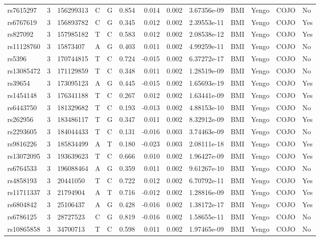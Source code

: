 \documentclass[11pt,twoside]{bristolthesis}
\begin{document}
\begin{longtable}[t]{lrlllrrrlllll}
rs7615297 & 3 & 156299313 & C & G & 0.854 & 0.014 & 0.002 & 3.67356e-09 & BMI & Yengo & COJO & No\\
rs6767619 & 3 & 156893782 & C & G & 0.345 & 0.012 & 0.002 & 2.39553e-11 & BMI & Yengo & COJO & Yes\\
\addlinespace
rs827092 & 3 & 157985182 & T & C & 0.583 & 0.012 & 0.002 & 2.08538e-12 & BMI & Yengo & COJO & Yes\\
rs11128760 & 3 & 15873407 & A & G & 0.403 & 0.011 & 0.002 & 4.99259e-11 & BMI & Yengo & COJO & No\\
rs5396 & 3 & 170744815 & T & C & 0.724 & -0.015 & 0.002 & 6.37272e-17 & BMI & Yengo & COJO & No\\
rs13085472 & 3 & 171129859 & T & C & 0.348 & 0.011 & 0.002 & 1.28519e-09 & BMI & Yengo & COJO & No\\
rs39654 & 3 & 173095123 & A & G & 0.445 & -0.015 & 0.002 & 1.65693e-19 & BMI & Yengo & COJO & Yes\\
\addlinespace
rs1454148 & 3 & 176341188 & T & C & 0.267 & 0.012 & 0.002 & 1.63441e-09 & BMI & Yengo & COJO & Yes\\
rs6443750 & 3 & 181329682 & T & C & 0.193 & -0.013 & 0.002 & 4.88153e-10 & BMI & Yengo & COJO & No\\
rs262956 & 3 & 183486117 & T & G & 0.347 & 0.011 & 0.002 & 8.32912e-09 & BMI & Yengo & COJO & Yes\\
rs2293605 & 3 & 184044433 & T & C & 0.131 & -0.016 & 0.003 & 3.74463e-09 & BMI & Yengo & COJO & No\\
rs9816226 & 3 & 185834499 & A & T & 0.180 & -0.023 & 0.003 & 2.08111e-18 & BMI & Yengo & COJO & Yes\\
\addlinespace
rs13072095 & 3 & 193639623 & T & C & 0.666 & 0.010 & 0.002 & 1.96427e-09 & BMI & Yengo & COJO & Yes\\
rs6764533 & 3 & 196088464 & A & G & 0.359 & 0.011 & 0.002 & 9.61267e-10 & BMI & Yengo & COJO & No\\
rs4858193 & 3 & 20441050 & T & C & 0.722 & 0.012 & 0.002 & 6.70792e-11 & BMI & Yengo & COJO & Yes\\
rs11711337 & 3 & 21794904 & A & T & 0.716 & -0.012 & 0.002 & 1.28816e-09 & BMI & Yengo & COJO & Yes\\
rs6804842 & 3 & 25106437 & A & G & 0.428 & -0.016 & 0.002 & 1.38172e-17 & BMI & Yengo & COJO & Yes\\
\addlinespace
rs6786125 & 3 & 28727523 & C & G & 0.819 & -0.016 & 0.002 & 1.58655e-11 & BMI & Yengo & COJO & No\\
rs10865858 & 3 & 34700713 & T & C & 0.598 & 0.011 & 0.002 & 1.97465e-09 & BMI & Yengo & COJO & No\\

\end{longtable}
\end{document}
